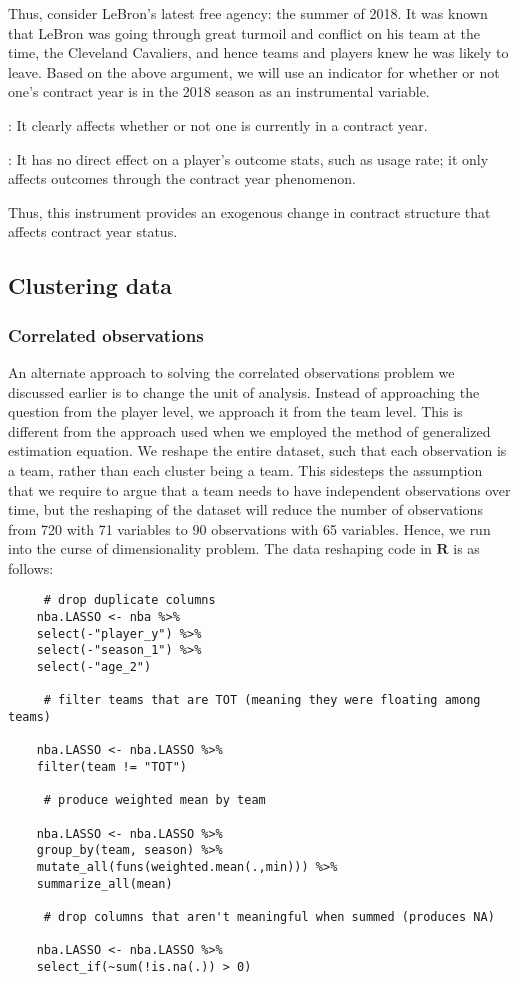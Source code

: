 \documentclass[12pt]{article}
\begin{document}
	Thus, consider LeBron’s latest free agency: the summer of 2018. It was known that LeBron was going through great turmoil and conflict on his team at the time, the Cleveland Cavaliers, and hence teams and players knew he was likely to leave. Based on the above argument, we will use an indicator for whether or not one’s contract year is in the 2018 season as an instrumental variable.
	
	: It clearly affects whether or not one is currently in a contract year.
	
	: It has no direct effect on a player’s outcome stats, such as usage rate; it only affects outcomes through the contract year phenomenon.
	
	Thus, this instrument provides an exogenous change in contract structure that affects contract year status.
	
	\subsection{Clustering data}
	
	\subsubsection{Correlated observations}
	
	An alternate approach to solving the correlated observations problem we discussed earlier is to change the unit of analysis. Instead of approaching the question from the player level, we approach it from the team level. This is different from the approach used when we employed the method of generalized estimation equation. We reshape the entire dataset, such that each observation is a team, rather than each cluster being a team. This sidesteps the assumption that we require to argue that a team needs to have independent observations over time, but the reshaping of the dataset will reduce the number of observations from 720 with 71 variables to 90 observations with 65 variables. Hence, we run into the curse of dimensionality problem. The data reshaping code in $\textbf{R}$ is as follows:
	
	\begin{lstlisting}
	 # drop duplicate columns
	nba.LASSO <- nba %>%
	select(-"player_y") %>%
	select(-"season_1") %>%
	select(-"age_2")
	
	 # filter teams that are TOT (meaning they were floating among teams)
	
	nba.LASSO <- nba.LASSO %>%
	filter(team != "TOT")
	
	 # produce weighted mean by team
	
	nba.LASSO <- nba.LASSO %>%
	group_by(team, season) %>%
	mutate_all(funs(weighted.mean(.,min))) %>%
	summarize_all(mean)
	
	 # drop columns that aren't meaningful when summed (produces NA)
	
	nba.LASSO <- nba.LASSO %>%
	select_if(~sum(!is.na(.)) > 0)
	\end{lstlisting}
	
\end{document}
